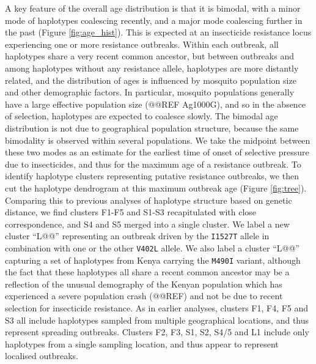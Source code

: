 \documentclass[a4paper,11pt,abstracton]{scrartcl}
\begin{document}
%
A key feature of the overall age distribution is that it is bimodal, with a minor mode of haplotypes coalescing recently, and a major mode coalescing further in the past (Figure \ref{fig:age_hist}).
%
This is expected at an insecticide resistance locus experiencing one or more resistance outbreaks.
%
Within each outbreak, all haplotypes share a very recent common ancestor, but between outbreaks and among haplotypes without any resistance allele, haplotypes are more distantly related, and the distribution of ages is influenced by mosquito population size and other demographic factors.
%
In particular, mosquito populations generally have a large effective population size (@@REF Ag1000G), and so in the absence of selection, haplotypes are expected to coalesce slowly.
%
The bimodal age distribution is not due to geographical population structure, because the same bimodality is observed within several populations.
%
We take the midpoint between these two modes as an estimate for the earliest time of onset of selective pressure due to insecticides, and thus for the maximum age of a resistance outbreak.
%
To identify haplotype clusters representing putative resistance outbreaks, we then cut the haplotype dendrogram at this maximum outbreak age (Figure \ref{fig:tree}).
%
Comparing this to previous analyses of haplotype structure based on genetic distance, we find clusters F1-F5 and S1-S3 recapitulated with close correspondence, and S4 and S5 merged into a single cluster.
%
We label a new cluster ``L@@'' representing an outbreak driven by the \texttt{I1527T} allele in combination with one or the other \texttt{V402L} allele.
%
We also label a cluster ``L@@'' capturing a set of haplotypes from Kenya carrying the \texttt{M490I} variant, although the fact that these haplotypes all share a recent common ancestor may be a reflection of the unusual demography of the Kenyan population which has experienced a severe population crash (@@REF) and not be due to recent selection for insecticide resistance.
%
As in earlier analyses, clusters F1, F4, F5 and S3 all include haplotypes sampled from multiple geographical locations, and thus represent spreading outbreaks.
%
Clusters F2, F3, S1, S2, S4/5 and L1 include only haplotypes from a single sampling location, and thus appear to represent localised outbreaks.
\end{document}
